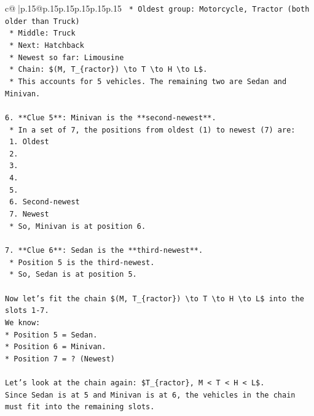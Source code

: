 \documentclass{article}
\begin{document}
{\begin{supertabular}{c@{$\;$}|p{.15\linewidth}@{}p{.15\linewidth}p{.15\linewidth}p{.15\linewidth}p{.15\linewidth}p{.15\linewidth}}
{{{\texttt{        *   Oldest group: Motorcycle, Tractor (both older than Truck)} \\
\texttt{        *   Middle: Truck} \\
\texttt{        *   Next: Hatchback} \\
\texttt{        *   Newest so far: Limousine} \\
\texttt{    *   Chain: \$(M, T\_\{ractor\}) \textbackslash{}to T \textbackslash{}to H \textbackslash{}to L\$.} \\
\texttt{    *   This accounts for 5 vehicles. The remaining two are Sedan and Minivan.} \\
\\ 
\texttt{6.  **Clue 5**: Minivan is the **second{-}newest**.} \\
\texttt{    *   In a set of 7, the positions from oldest (1) to newest (7) are:} \\
\texttt{        1.  Oldest} \\
\texttt{        2.} \\
\texttt{        3.} \\
\texttt{        4.} \\
\texttt{        5.} \\
\texttt{        6.  Second{-}newest} \\
\texttt{        7.  Newest} \\
\texttt{    *   So, Minivan is at position 6.} \\
\\ 
\texttt{7.  **Clue 6**: Sedan is the **third{-}newest**.} \\
\texttt{    *   Position 5 is the third{-}newest.} \\
\texttt{    *   So, Sedan is at position 5.} \\
\\ 
\texttt{Now let's fit the chain \$(M, T\_\{ractor\}) \textbackslash{}to T \textbackslash{}to H \textbackslash{}to L\$ into the slots 1{-}7.} \\
\texttt{We know:} \\
\texttt{*   Position 5 = Sedan.} \\
\texttt{*   Position 6 = Minivan.} \\
\texttt{*   Position 7 = ? (Newest)} \\
\\ 
\texttt{Let's look at the chain again: \$T\_\{ractor\}, M < T < H < L\$.} \\
\texttt{Since Sedan is at 5 and Minivan is at 6, the vehicles in the chain must fit into the remaining slots.} \\
}}}
\end{supertabular}}
\end{document}
